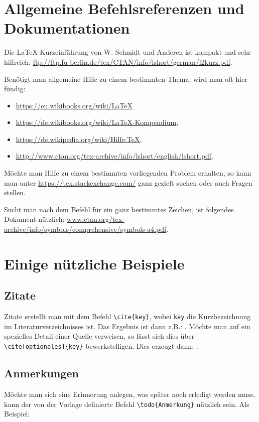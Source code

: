 \section{Allgemeine Befehlsreferenzen und Dokumentationen}
Die LaTeX-Kurzeinführung von W. Schmidt und Anderen ist kompakt und sehr hilfreich: \url{ftp://ftp.fu-berlin.de/tex/CTAN/info/lshort/german/l2kurz.pdf}.

Benötigt man allgemeine Hilfe zu einem bestimmten Thema, wird man oft hier fündig:

\begin{itemize}
 \item \url{https://en.wikibooks.org/wiki/LaTeX}
 \item \url{https://de.wikibooks.org/wiki/LaTeX-Kompendium},
 \item \url{https://de.wikipedia.org/wiki/Hilfe:TeX},
 \item \url{http://www.ctan.org/tex-archive/info/lshort/english/lshort.pdf}.
\end{itemize}

Möchte man Hilfe zu einem bestimmten vorliegenden Problem erhalten, so kann man unter \url{https://tex.stackexchange.com/} ganz gezielt suchen oder auch Fragen stellen.

Sucht man nach dem Befehl für ein ganz bestimmtes Zeichen, ist folgendes Dokument nützlich: \url{www.ctan.org/tex-archive/info/symbols/comprehensive/symbols-a4.pdf}.

\section{Einige nützliche Beispiele}
\subsection{Zitate}
Zitate erstellt man mit dem Befehl \verb|\cite{key}|, wobei \verb|key| die Kurzbezeichnung im Literaturverzeichnisses ist. Das Ergebnis ist dann z.B.: \cite{EKS07}. Möchte man auf ein spezielles Detail einer Quelle verweisen, so lässt sich dies über \verb|\cite[optionales]{key}| bewerkstelligen. Dies erzeugt dann: \cite[S. 42]{EKS07}.

\subsection{Anmerkungen}
Möchte man sich eine Erinnerung anlegen, was später noch erledigt werden muss, kann der von der Vorlage definierte Befehl \verb|\todo{Anmerkung}| nützlich sein. Als Beispiel:

